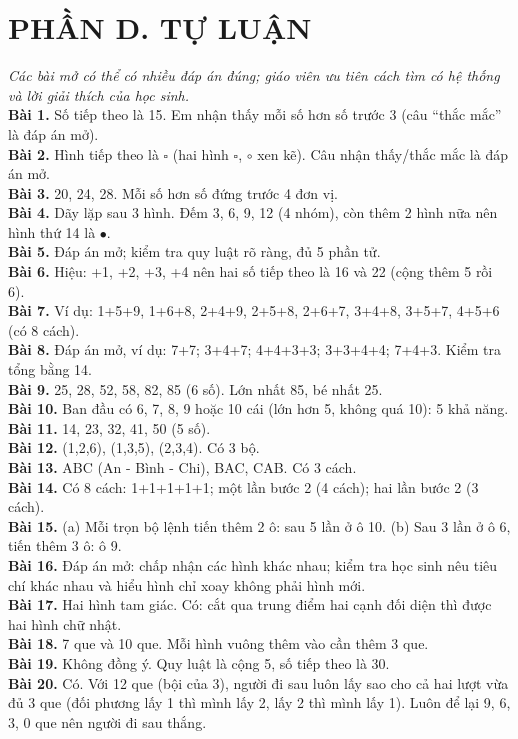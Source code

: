 \documentclass[11pt,a4paper]{article}
\begin{document}
\section*{PHẦN D. TỰ LUẬN}
\textit{Các bài mở có thể có nhiều đáp án đúng; giáo viên ưu tiên cách tìm có hệ thống và lời giải thích của học sinh.}\\
\textbf{Bài 1.} Số tiếp theo là 15. Em nhận thấy mỗi số hơn số trước 3 (câu ``thắc mắc'' là đáp án mở).\\
\textbf{Bài 2.} Hình tiếp theo là $\square$ (hai hình $\square$, $\circ$ xen kẽ). Câu nhận thấy/thắc mắc là đáp án mở.\\
\textbf{Bài 3.} 20, 24, 28. Mỗi số hơn số đứng trước 4 đơn vị.\\
\textbf{Bài 4.} Dãy lặp sau 3 hình. Đếm 3, 6, 9, 12 (4 nhóm), còn thêm 2 hình nữa nên hình thứ 14 là $\bullet$.\\
\textbf{Bài 5.} Đáp án mở; kiểm tra quy luật rõ ràng, đủ 5 phần tử.\\
\textbf{Bài 6.} Hiệu: +1, +2, +3, +4 nên hai số tiếp theo là 16 và 22 (cộng thêm 5 rồi 6).\\
\textbf{Bài 7.} Ví dụ: 1+5+9, 1+6+8, 2+4+9, 2+5+8, 2+6+7, 3+4+8, 3+5+7, 4+5+6 (có 8 cách).\\
\textbf{Bài 8.} Đáp án mở, ví dụ: 7+7; 3+4+7; 4+4+3+3; 3+3+4+4; 7+4+3. Kiểm tra tổng bằng 14.\\
\textbf{Bài 9.} 25, 28, 52, 58, 82, 85 (6 số). Lớn nhất 85, bé nhất 25.\\
\textbf{Bài 10.} Ban đầu có 6, 7, 8, 9 hoặc 10 cái (lớn hơn 5, không quá 10): 5 khả năng.\\
\textbf{Bài 11.} 14, 23, 32, 41, 50 (5 số).\\
\textbf{Bài 12.} (1,2,6), (1,3,5), (2,3,4). Có 3 bộ.\\
\textbf{Bài 13.} ABC (An - Bình - Chi), BAC, CAB. Có 3 cách.\\
\textbf{Bài 14.} Có 8 cách: 1+1+1+1+1; một lần bước 2 (4 cách); hai lần bước 2 (3 cách).\\
\textbf{Bài 15.} (a) Mỗi trọn bộ lệnh tiến thêm 2 ô: sau 5 lần ở ô 10. (b) Sau 3 lần ở ô 6, tiến thêm 3 ô: ô 9.\\
\textbf{Bài 16.} Đáp án mở: chấp nhận các hình khác nhau; kiểm tra học sinh nêu tiêu chí khác nhau và hiểu hình chỉ xoay không phải hình mới.\\
\textbf{Bài 17.} Hai hình tam giác. Có: cắt qua trung điểm hai cạnh đối diện thì được hai hình chữ nhật.\\
\textbf{Bài 18.} 7 que và 10 que. Mỗi hình vuông thêm vào cần thêm 3 que.\\
\textbf{Bài 19.} Không đồng ý. Quy luật là cộng 5, số tiếp theo là 30.\\
\textbf{Bài 20.} Có. Với 12 que (bội của 3), người đi sau luôn lấy sao cho cả hai lượt vừa đủ 3 que (đối phương lấy 1 thì mình lấy 2, lấy 2 thì mình lấy 1). Luôn để lại 9, 6, 3, 0 que nên người đi sau thắng.\\
\end{document}
